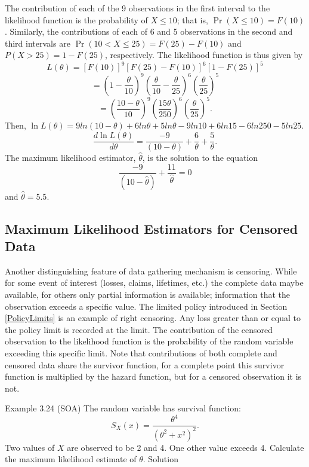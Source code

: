 \documentclass[]{book}
\theoremstyle{definition}
\theoremstyle{definition}
\theoremstyle{definition}
\theoremstyle{remark}
\begin{document}
The contribution of each of the 9 observations in the first interval to
the likelihood function is the probability of \(X \leq 10\); that is,
\(\Pr\left( X \leq 10 \right) = F\left( 10 \right)\). Similarly, the
contributions of each of 6 and 5 observations in the second and third
intervals are
\(\Pr\left( 10 < X \leq 25 \right) = F\left( 25 \right) - F(10)\) and
\(P\left( X > 25 \right) = 1 - F(25)\), respectively. The likelihood
function is thus given by
\[L\left( \theta \right) = \left\lbrack F\left( 10 \right) \right\rbrack^{9}\left\lbrack F\left( 25 \right) - F(10) \right\rbrack^{6}\left\lbrack 1 - F(25) \right\rbrack^{5}\]
\[{= \left( 1 - \frac{\theta}{10} \right)}^{9}\left( \frac{\theta}{10} - \frac{\theta}{25} \right)^{6}\left( \frac{\theta}{25} \right)^{5}\]
\[{= \left( \frac{10 - \theta}{10} \right)}^{9}\left( \frac{15\theta}{250} \right)^{6}\left( \frac{\theta}{25} \right)^{5}.\]
Then,
\(\ln L \left( \theta \right) = 9ln\left( 10 - \theta \right) + 6ln\theta + 5ln\theta - 9ln10 + 6ln15 - 6ln250 - 5ln25\).
\[\frac{d \ln L \left( \theta \right)}{d \theta} = \frac{- 9}{\left( 10 - \theta \right)} + \frac{6}{\theta} + \frac{5}{\theta}.\]
The maximum likelihood estimator, \(\hat{\theta}\), is the solution to
the equation
\[\frac{- 9}{\left( 10 - \hat{\theta} \right)} + \frac{11}{\hat{\theta}} = 0\]
and \(\hat{\theta} = 5.5\).

\subsection{Maximum Likelihood Estimators for Censored
Data}\label{maximum-likelihood-estimators-for-censored-data}

Another distinguishing feature of data gathering mechanism is censoring.
While for some event of interest (losses, claims, lifetimes, etc.) the
complete data maybe available, for others only partial information is
available; information that the observation exceeds a specific value.
The limited policy introduced in Section \ref{PolicyLimits} is an
example of right censoring. Any loss greater than or equal to the policy
limit is recorded at the limit. The contribution of the censored
observation to the likelihood function is the probability of the random
variable exceeding this specific limit. Note that contributions of both
complete and censored data share the survivor function, for a complete
point this survivor function is multiplied by the hazard function, but
for a censored observation it is not.

Example 3.24 (SOA) The random variable has survival function:
\[S_{X}\left( x \right) = \frac{\theta^{4}}{\left( \theta^{2} + x^{2} \right)^{2}}.\]
Two values of \(X\) are observed to be 2 and 4. One other value exceeds
4. Calculate the maximum likelihood estimate of \(\theta\). Solution
\end{document}
